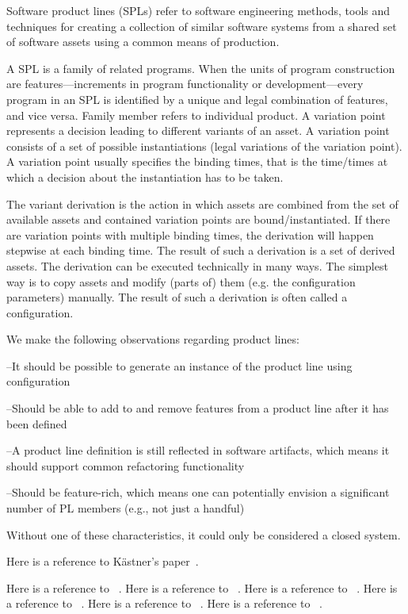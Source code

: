 
Software product lines (SPLs) refer to software engineering methods, tools and
techniques for creating a collection of similar software systems from a shared set of
software assets using a common means of production.

A SPL is a family of related programs. When the units of program construction are features—increments in
program functionality or development—every program in an SPL is identified by a unique and legal
combination of features, and vice versa. Family member refers to individual product. A variation point
represents a decision leading to different variants of an asset. A variation point consists of a set of
possible instantiations (legal variations of the variation point). A variation point usually specifies the
binding times, that is the time/times at which a decision about the instantiation has to be taken.

The variant derivation is the action in which assets are combined from the set of available assets and
contained variation points are bound/instantiated. If there are variation points with multiple binding times,
the derivation will happen stepwise at each binding time. The result of such a derivation is a set of derived
assets. The derivation can be executed technically in many ways. The simplest way is to copy assets and modify
(parts of) them (e.g. the configuration parameters) manually. The result of such a derivation is often called a
configuration.

We make the following observations regarding product lines:

--It should be possible to generate an instance of the product line using configuration

--Should be able to add to and remove features from a product line after it has been defined

--A product line definition is still reflected in software artifacts, which means it should support common refactoring functionality

--Should be feature-rich, which means one can potentially envision a significant number of PL members (e.g., not just a handful)

Without one of these characteristics, it could only be considered a closed system.

Here is a reference to K\"{a}stner's paper~\cite{Kastner:2012}.

Here is a reference to ~\cite{leich2005tool}.
Here is a reference to ~\cite{proksch2014tool}.
Here is a reference to ~\cite{7203038}.
Here is a reference to ~\cite{Sayre:2005:UMA:1082983.1083277}.
Here is a reference to ~\cite{Setyautami:2016:UPD:2934466.2934479}.
Here is a reference to ~\cite{Sousa:2016:EFM:2934466.2934475}.

